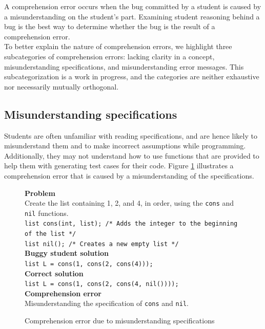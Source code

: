 \documentclass{sig-alternate}
\begin{document}
A comprehension error occurs when the bug committed by a student is
caused by a misunderstanding on the student's part. Examining student
reasoning behind a bug is the best way to determine whether the bug is
the result of a comprehension error.\\

To better explain the nature of comprehension errors, we highlight
three subcategories of comprehension errors: lacking clarity in a
concept, misunderstanding specifications, and misunderstanding error
messages. This subcategorization is a work in progress, and the
categories are neither exhaustive nor necessarily mutually orthogonal.

\subsection{Misunderstanding specifications}
\label{sec:comp1}

Students are often unfamiliar with reading specifications, and are
hence likely to misunderstand them and to make incorrect assumptions
while programming. Additionally, they may not understand how to use
functions that are provided to help them with generating test cases
for their code. Figure \ref{fig:comp1} illustrates a comprehension
error that is caused by a misunderstanding of the specifications.

\begin{figure}
\begin{framed}
\setlength{\parindent}{0cm}
\textbf{Problem}\\
Create the list containing 1, 2, and 4, in order, using the \texttt{cons} and \texttt{nil} functions.\\

\texttt{list cons(int, list); /* Adds the integer to the beginning of the list */\\ list nil(); /* Creates a new empty list */}\\

\textbf{Buggy student solution}\\
\texttt{list L = cons(1, cons(2, cons(4)));}\\

\textbf{Correct solution}\\
\texttt{list L = cons(1, cons(2, cons(4, nil())));}\\

\textbf{Comprehension error}\\
Misunderstanding the specification of \texttt{cons} and \texttt{nil}.
\end{framed}
\vspace{-0.1in}
\caption{Comprehension error due to misunderstanding specifications}
\label{fig:comp1}
\end{figure}
\end{document}
